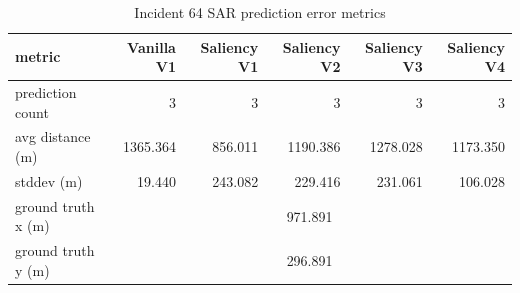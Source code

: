 \begin{table}[ht]
\centering
\caption{Incident 64 SAR prediction error metrics}
\label{tab:sar-incident-64}
\begin{tabular}{lrrrrr}
\hline
metric & Vanilla V1 & Saliency V1 & Saliency V2 & Saliency V3 & Saliency V4 \\
\hline
prediction count & 3 & 3 & 3 & 3 & 3 \\
avg distance (m) & 1365.364 & 856.011 & 1190.386 & 1278.028 & 1173.350 \\
stddev (m) & 19.440 & 243.082 & 229.416 & 231.061 & 106.028 \\
ground truth x (m) & \multicolumn{5}{c}{971.891} \\
ground truth y (m) & \multicolumn{5}{c}{296.891} \\
\hline
\end{tabular}
\end{table}
